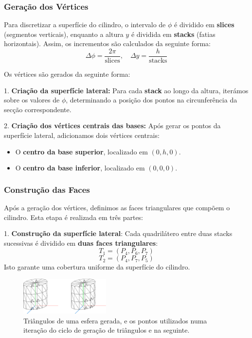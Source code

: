 \documentclass[12pt, a4paper]{article}
\begin{document}
\subsubsection{Geração dos Vértices}
Para discretizar a superfície do cilindro, o intervalo de \( \phi \) é dividido em \textbf{slices}
(segmentos verticais), enquanto a altura \( y \) é dividida em \textbf{stacks} (fatias horizontais).
Assim, os incrementos são calculados da seguinte forma:
\[
\Delta \phi = \frac{2\pi}{\text{slices}}, \quad \Delta y = \frac{h}{\text{stacks}}
\]

Os vértices são gerados da seguinte forma:

1. \textbf{Criação da superfície lateral:} Para cada \textbf{stack} ao longo da altura, iterámos
sobre os valores de \( \phi \), determinando a posição dos pontos na circunferência da secção
correspondente.

2. \textbf{Criação dos vértices centrais das bases:} Após gerar os pontos da superfície lateral,
adicionamos dois vértices centrais:
\begin{itemize}
\item O \textbf{centro da base superior}, localizado em \( (0, h, 0) \).
\item O \textbf{centro da base inferior}, localizado em \( (0, 0, 0) \).
\end{itemize}

\subsubsection{Construção das Faces}
Após a geração dos vértices, definimos as faces triangulares que compõem o cilindro. Esta etapa
é realizada em três partes:

1. \textbf{Construção da superfície lateral}:
Cada quadrilátero entre duas stacks sucessivas é dividido em \textbf{duas faces triangulares}:
\[
T_1 = (P_4, P_6, P_7)
\]
\[
T_2 = (P_4, P_7, P_5)
\]
Isto garante uma cobertura uniforme da superfície do cilindro.

\begin{figure}[H]
    \centering
    \includegraphics[width=0.4\textwidth]{res/figures/cylinder.pdf}
    \caption{
        Triângulos de uma esfera gerada, e os pontos utilizados numa iteração do ciclo de geração
        de triângulos e na seguinte.
    }
\end{figure}
\end{document}
